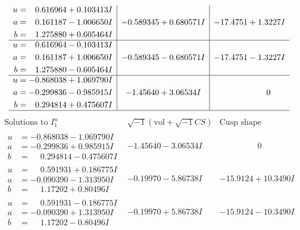 \documentclass[1p]{elsarticle_modified}
\theoremstyle{definition}
\newcommand{\I}{\sqrt{-1}}
\begin{document}
$$\begin{array}{c|c|c}
\begin{aligned}
u &= \phantom{-}0.616964 + 0.103413 I \\
a &= \phantom{-}0.161187 - 1.006650 I \\
b &= \phantom{-}1.275880 + 0.605464 I\end{aligned}
 & -0.589345 + 0.680571 I & -17.4751 + 1.3227 I \\ \hline\begin{aligned}
u &= \phantom{-}0.616964 - 0.103413 I \\
a &= \phantom{-}0.161187 + 1.006650 I \\
b &= \phantom{-}1.275880 - 0.605464 I\end{aligned}
 & -0.589345 - 0.680571 I & -17.4751 - 1.3227 I \\ \hline\begin{aligned}
u &= -0.868038 + 1.069790 I \\
a &= -0.299836 - 0.985915 I \\
b &= \phantom{-}0.294814 + 0.475607 I\end{aligned}
 & -1.45640 + 3.06534 I & \phantom{-0.000000 } 0\\
 \hline 
 \end{array}$$\newpage$$\begin{array}{c|c|c}  
\text{Solutions to }I^u_{1}& \I (\text{vol} + \sqrt{-1}CS) & \text{Cusp shape}\\
 \hline 
\begin{aligned}
u &= -0.868038 - 1.069790 I \\
a &= -0.299836 + 0.985915 I \\
b &= \phantom{-}0.294814 - 0.475607 I\end{aligned}
 & -1.45640 - 3.06534 I & \phantom{-0.000000 } 0 \\ \hline\begin{aligned}
u &= \phantom{-}0.591931 + 0.186775 I \\
a &= -0.090390 - 1.313950 I \\
b &= \phantom{-}1.17202 + 0.80496 I\end{aligned}
 & -0.19970 - 5.86738 I & -15.9124 + 10.3490 I \\ \hline\begin{aligned}
u &= \phantom{-}0.591931 - 0.186775 I \\
a &= -0.090390 + 1.313950 I \\
b &= \phantom{-}1.17202 - 0.80496 I\end{aligned}
 & -0.19970 + 5.86738 I & -15.9124 - 10.3490 I \\ \hline\begin{aligned}

\end{aligned}
\end{array}$$
\end{document}
